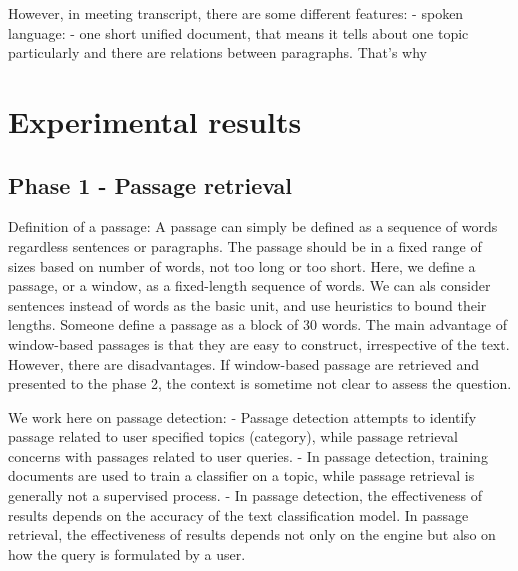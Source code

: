 \documentclass[12pt, a4paper]{report}
\begin{document}
However, in meeting transcript, there are some different features:
- spoken language:
- one short unified document, that means it tells about one topic particularly and there are relations between paragraphs.
That's why 

\newpage
\chapter{Experimental results}
\section{Phase 1 - Passage retrieval}
Definition of a passage: A passage can simply be defined as a sequence of words regardless sentences or paragraphs. 
The passage should be in a fixed range of sizes based on number of words, not too long or too short. Here, we define a passage, or a window, as a fixed-length sequence of words.
We can als consider sentences instead of words as the basic unit, and use heuristics to bound their lengths. Someone define a passage as a block of 30 words.
The main advantage of window-based passages is that they are easy to construct, irrespective of the text. However, there are disadvantages. If window-based passage are retrieved and presented to the phase 2, the context is sometime not clear to assess the question.

We work here on passage detection: 
- Passage detection attempts to identify passage related to user specified topics (category), while passage retrieval concerns with passages related to user queries.
- In passage detection, training documents are used to train a classifier on a topic, while passage retrieval is generally not a supervised process.
- In passage detection, the effectiveness of results depends on the accuracy of the text classification model. In passage retrieval, the effectiveness of results depends not only on the engine but also on how the query is formulated by a user.
\end{document}
